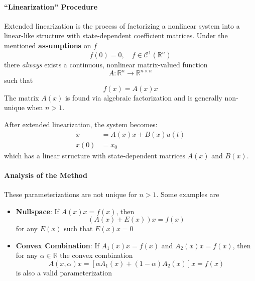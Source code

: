\paragraph{``Linearization'' Procedure}

Extended linearization is the process of factorizing a nonlinear system into a linear-like structure with state-dependent coefficient matrices.
\newpar{}
Under the mentioned \textbf{assumptions} on $f$
\begin{equation*}
    f(0) = 0, \quad f \in \mathcal{C}^1(\mathbb{R}^n)
\end{equation*}
there \textit{always} exists a continuous, nonlinear matrix-valued function
\begin{equation*}
    A : \mathbb{R}^n \to \mathbb{R}^{n \times n}
\end{equation*}
such that
\begin{equation*}
    f(x) = A(x) x
\end{equation*}
The matrix $A(x)$ is found via algebraic factorization and is generally non-unique when $n > 1$.

\newpar{}

After extended linearization, the system becomes:
\begin{align*}
    \dot{x} & = A(x) x + B(x) u(t) \\
    x(0)    & = x_0
\end{align*}
which has a linear structure with state-dependent matrices $A(x)$ and $B(x)$.

\paragraph{Analysis of the Method}

These parameterizations are not unique for $n > 1$. Some examples are
\begin{itemize}
    \item \textbf{Nullspace}: If $A(x)x = f(x)$, then
          \begin{equation*}
              (A(x) + E(x))x = f(x)
          \end{equation*}
          for any $E(x)$ such that $E(x)x = 0$
    \item \textbf{Convex Combination}: If $A_1(x)x = f(x)$ and $A_2(x)x = f(x)$, then for any $\alpha \in \mathbb{R}$ the convex combination
          \begin{equation*}
              A(x, \alpha) x = [\alpha A_1(x) + (1 - \alpha) A_2(x)] x = f(x)
          \end{equation*}
          is also a valid parameterization
\end{itemize}


